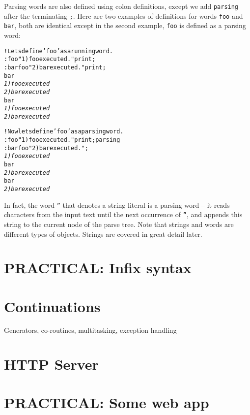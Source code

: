 \documentclass[english]{article}
\begin{document}
Parsing words are also defined using colon definitions, except we
add \texttt{parsing} after the terminating \texttt{;}. Here are two
examples of definitions for words \texttt{foo} and \texttt{bar}, both
are identical except in the second example, \texttt{foo} is defined
as a parsing word:

\begin{alltt}
! Lets define 'foo' as a running word.
: foo "1) foo executed." print ;
: bar foo "2) bar executed." print ;
bar
\emph{1) foo executed}
\emph{2) bar executed}
bar
\emph{1) foo executed}
\emph{2) bar executed}

! Now lets define 'foo' as a parsing word.
: foo "1) foo executed." print ; parsing
: bar foo "2) bar executed." ;
\emph{1) foo executed}
bar
\emph{2) bar executed}
bar
\emph{2) bar executed}
\end{alltt}
In fact, the word \texttt{{}''} that denotes a string literal is
a parsing word -- it reads characters from the input text until the
next occurrence of \texttt{{}''}, and appends this string to the
current node of the parse tree. Note that strings and words are different
types of objects. Strings are covered in great detail later.


\section{PRACTICAL: Infix syntax}


\section{Continuations}

Generators, co-routines, multitasking, exception handling


\section{HTTP Server}


\section{PRACTICAL: Some web app}
\end{document}
